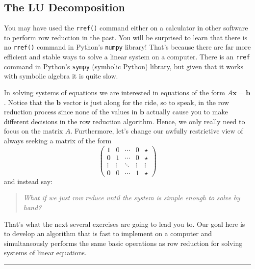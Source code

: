 \documentclass[
]{book}
\theoremstyle{definition}
\theoremstyle{definition}
\theoremstyle{definition}
\theoremstyle{remark}
\begin{document}
\hypertarget{the-lu-decomposition}{%
\subsection{The LU Decomposition}\label{the-lu-decomposition}}

You may have used the \texttt{rref()} command either on a calculator in other software to perform row reduction in the past. You will be surprised to learn that there is no \texttt{rref()} command in Python's \texttt{numpy} library! That's because there are far more efficient and stable ways to solve a linear system on a computer. There is an \texttt{rref} command in Python's \texttt{sympy} (symbolic Python) library, but given that it works with symbolic algebra it is quite slow.

In solving systems of equations we are interested in equations of the form \(A \boldsymbol{x} = \boldsymbol{b}\). Notice that the \(\boldsymbol{b}\) vector is just along for the ride, so to speak, in the row reduction process since none of the values in \(\boldsymbol{b}\) actually cause you to make different decisions in the row reduction algorithm. Hence, we only really need to focus on the matrix \(A\). Furthermore, let's change our awfully restrictive view of always seeking a matrix of the form
\[ \left( \begin{array}{cccc|c} 1 & 0 & \cdots & 0  & \star \\ 0 & 1 & \cdots & 0 & \star \\ \vdots & \vdots & \ddots & \vdots & \vdots \\ 0 & 0 & \cdots & 1 & \star \end{array} \right) \]
and instead say:

\begin{quote}
\emph{What if we just row reduce until the system is simple enough to solve by hand?}
\end{quote}

That's what the next several exercises are going to lead you to. Our goal here is to develop an algorithm that is fast to implement on a computer and simultaneously performs the same basic operations as row reduction for solving systems of linear equations.

\begin{center}\rule{0.5\linewidth}{0.5pt}\end{center}
\end{document}

